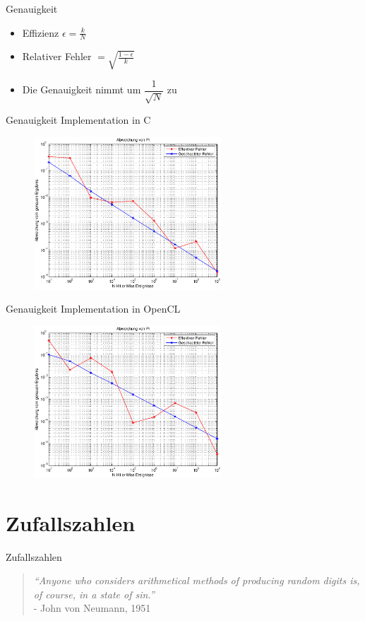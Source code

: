 \documentclass{beamer}
\begin{document}
\begin{frame}{Genauigkeit}
	\begin{itemize}
		\item<1-> Effizienz $\epsilon = \frac{k}{N}$
		\item<1->Relativer Fehler $= \sqrt{\frac{1-\epsilon}{k}}$
		\item<1-> Die Genauigkeit nimmt um $\dfrac{1}{\sqrt{N}}$ zu
	\end{itemize}
\end{frame}

\begin{frame}{Genauigkeit}
	Implementation in C
	\begin{figure}
		\centering
		\includegraphics[width=7cm]{images/Abweichung_C.eps}
	\end{figure}
\end{frame}
\begin{frame}{Genauigkeit}
	Implementation in OpenCL
	\begin{figure}
		\centering
		\includegraphics[width=7cm]{images/Abweichung_OpenCl.eps}
	\end{figure}
\end{frame}

\section{Zufallszahlen}
\begin{frame}{Zufallszahlen}
	\begin{quote}
	\textit{“Anyone who considers arithmetical methods of producing random digits is, of course, in a state of sin.”} \\ - John von Neumann, 1951
	\end{quote}
\end{frame}
\end{document}
